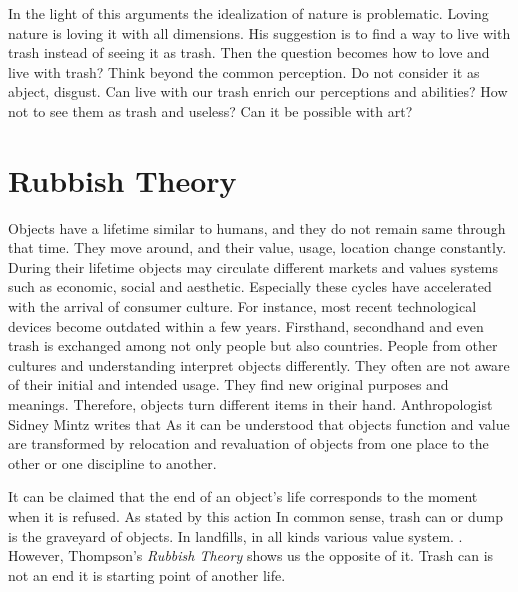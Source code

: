 In the light of this arguments the idealization of nature is problematic. Loving nature is loving it with all dimensions. His suggestion is to find a way to live with trash instead of seeing it as trash. Then the question becomes how to love and live with trash? Think beyond the common perception. Do not consider it as abject, disgust. Can live with our trash enrich our perceptions and abilities? How not to see them as trash and useless? Can it be possible with art?



\section{Rubbish Theory}
Objects have a lifetime similar to humans, and they do not remain same through that time. They move around, and their value, usage, location change constantly. During their lifetime objects may circulate different markets and values systems such as economic, social and aesthetic. Especially these cycles have accelerated with the arrival of consumer culture. For instance, most recent technological devices become outdated within a few years. Firsthand, secondhand and even trash is exchanged among not only people but also countries. People from other cultures and understanding interpret objects differently. They often are not aware of their initial and intended usage. They find new original purposes and meanings. Therefore, objects turn different items in their hand. Anthropologist Sidney Mintz \citep[as cited in][]{strasser1999waste} writes that  As it can be understood that objects function and value are transformed by relocation and revaluation of objects from one place to the other or one discipline to another. 

It can be claimed that the end of an object’s life corresponds to the moment when it is refused. As stated by \citet[63]{emgin2012trashion} this action  In common sense, trash can or dump is the graveyard of objects. In landfills,  in all kinds various value system.  \citep[63]{emgin2012trashion}. However, Thompson’s \textit{Rubbish Theory} shows us the opposite of it. Trash can is not an end it is starting point of another life.

